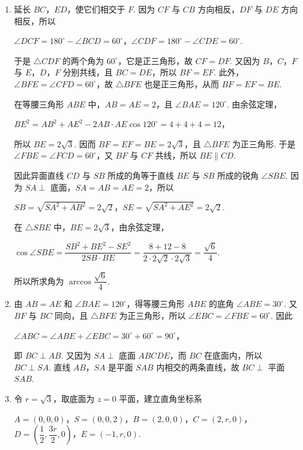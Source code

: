 \begin{solution}
\begin{enumerate}
\item 延长 \(BC\)，\(ED\)，使它们相交于 \(F\). 因为 \(CF\) 与 \(CB\) 方向相反，\(DF\) 与 \(DE\) 方向相反，所以

\(\angle DCF=180^{\circ}-\angle BCD=60^{\circ}\)，\(\angle CDF=180^{\circ}-\angle CDE=60^{\circ}\).

于是 \(\triangle CDF\) 的两个角为 \(60^{\circ}\)，它是正三角形，故 \(CF=DF\). 又因为 \(B\)，\(C\)，\(F\) 与 \(E\)，\(D\)，\(F\) 分别共线，且 \(BC=DE\)，所以 \(BF=EF\). 此外，\(\angle BFE=\angle CFD=60^{\circ}\)，故 \(\triangle BFE\) 也是正三角形，从而 \(BF=EF=BE\).

在等腰三角形 \(ABE\) 中，\(AB=AE=2\)，且 \(\angle BAE=120^{\circ}\). 由余弦定理，

\(BE^2=AB^2+AE^2-2AB\cdot AE\cos120^{\circ}=4+4+4=12\)，

所以 \(BE=2\sqrt{3}\). 因而 \(BF=EF=BE=2\sqrt{3}\)，且 \(\triangle BFE\) 为正三角形. 于是 \(\angle FBE=\angle FCD=60^{\circ}\)，又 \(BF\) 与 \(CF\) 共线，所以 \(BE\parallel CD\).

因此异面直线 \(CD\) 与 \(SB\) 所成的角等于直线 \(BE\) 与 \(SB\) 所成的锐角 \(\angle SBE\). 因为 \(SA\perp\) 底面，\(SA=AB=AE=2\)，所以

\(SB=\sqrt{SA^2+AB^2}=2\sqrt{2}\)，\(SE=\sqrt{SA^2+AE^2}=2\sqrt{2}\).

在 \(\triangle SBE\) 中，\(BE=2\sqrt{3}\)，由余弦定理，

\(\cos\angle SBE=\dfrac{SB^2+BE^2-SE^2}{2SB\cdot BE}=\dfrac{8+12-8}{2\cdot2\sqrt{2}\cdot2\sqrt{3}}=\dfrac{\sqrt{6}}{4}\).

所以所求角为 \(\arccos\dfrac{\sqrt{6}}{4}\).
\item 由 \(AB=AE\) 和 \(\angle BAE=120^{\circ}\)，得等腰三角形 \(ABE\) 的底角 \(\angle ABE=30^{\circ}\). 又 \(BF\) 与 \(BC\) 同向，且 \(\triangle BFE\) 为正三角形，所以 \(\angle EBC=\angle FBE=60^{\circ}\). 因此

\(\angle ABC=\angle ABE+\angle EBC=30^{\circ}+60^{\circ}=90^{\circ}\)，

即 \(BC\perp AB\). 又因为 \(SA\perp\) 底面 \(ABCDE\)，而 \(BC\) 在底面内，所以 \(BC\perp SA\). 直线 \(AB\)，\(SA\) 是平面 \(SAB\) 内相交的两条直线，故 \(BC\perp\) 平面 \(SAB\).
\item 令 \(r=\sqrt{3}\)，取底面为 \(z=0\) 平面，建立直角坐标系

\(A=(0,0,0)\)，\(S=(0,0,2)\)，\(B=(2,0,0)\)，\(C=(2,r,0)\)，\(D=\left(\dfrac12,\dfrac{3r}{2},0\right)\)，\(E=(-1,r,0)\).


\end{enumerate}
\end{solution}
